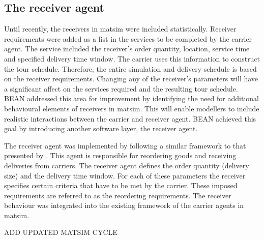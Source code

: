 
\subsection{The receiver agent}
Until recently, the receivers in \acrshort{matsim} were included statistically. Receiver requirements were added as a list in the services to be completed by the carrier agent. The service included the receiver's order quantity, location, service time and specified delivery time window. The carrier uses this information to construct the tour schedule. Therefore, the entire simulation and delivery schedule is based on the receiver requirements. Changing any of the receiver's parameters will have a significant affect on the services required and the resulting tour schedule. BEAN addressed this area for improvement by identifying the need for additional behavioural elements of receivers in \acrshort{matsim}. This will enable modellers to include realistic interactions between the carrier and receiver agent. BEAN achieved this goal by introducing another software layer, the receiver agent. \par

The receiver agent was implemented by following a similar framework to that presented by \citet{schroeder2012towards}. This agent is responsible for reordering goods and receiving deliveries from carriers. The receiver agent defines the order quantity (delivery size) and the delivery time window. For each of these parameters the receiver specifies certain criteria that have to be met by the carrier. These imposed requirements are referred to as the reordering requirements. The receiver behaviour was integrated into the existing framework of the carrier agents in \acrshort{matsim}. \par

ADD UPDATED MATSIM CYCLE

